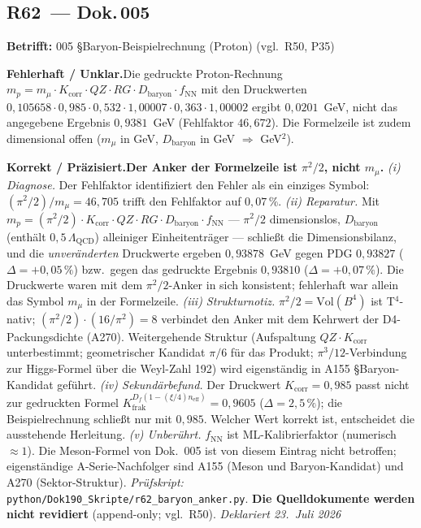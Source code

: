 \medskip


\subsection*{R62~--- Dok.\,005}

\noindent\textbf{Betrifft:} 005 \S{}Baryon-Beispielrechnung (Proton) (vgl.\ R50, P35)


\smallskip\noindent\textbf{Fehlerhaft / Unklar.}\quad Die gedruckte Proton-Rechnung
   $m_p = m_\mu \cdot K_\text{corr} \cdot QZ \cdot RG \cdot D_\text{baryon} \cdot f_\text{NN}$
   mit den Druckwerten $0{,}105658 \cdot 0{,}985 \cdot 0{,}532 \cdot 1{,}00007 \cdot 0{,}363 \cdot 1{,}00002$
   ergibt $0{,}0201$~GeV, nicht das angegebene Ergebnis $0{,}9381$~GeV
   (Fehlfaktor $46{,}672$). Die Formelzeile ist zudem dimensional offen
   ($m_\mu$ in GeV, $D_\text{baryon}$ in GeV $\Rightarrow$ GeV$^2$).


\smallskip\noindent\textbf{Korrekt / Präzisiert.}\quad \textbf{Der Anker der Formelzeile ist $\pi^2/2$, nicht $m_\mu$.}
   \emph{(i) Diagnose.} Der Fehlfaktor identifiziert den Fehler als ein
   einziges Symbol: $(\pi^2/2)/m_\mu = 46{,}705$ trifft den Fehlfaktor
   auf $0{,}07\,\%$. \emph{(ii) Reparatur.} Mit
   $m_p = (\pi^2/2)\cdot K_\text{corr}\cdot QZ\cdot RG\cdot
   D_\text{baryon}\cdot f_\text{NN}$ --- $\pi^2/2$ dimensionslos,
   $D_\text{baryon}$ (enthält $0{,}5\,\Lambda_\text{QCD}$) alleiniger
   Einheitenträger --- schließt die Dimensionsbilanz, und die
   \emph{unveränderten} Druckwerte ergeben $0{,}93878$~GeV gegen
   PDG $0{,}93827$ ($\Delta = +0{,}05\,\%$) bzw.\ gegen das gedruckte
   Ergebnis $0{,}93810$ ($\Delta = +0{,}07\,\%$). Die Druckwerte waren
   mit dem $\pi^2/2$-Anker in sich konsistent; fehlerhaft war allein
   das Symbol $m_\mu$ in der Formelzeile. \emph{(iii) Strukturnotiz.}
   $\pi^2/2 = \text{Vol}(B^4)$ ist T$^4$-nativ;
   $(\pi^2/2)\cdot(16/\pi^2) = 8$ verbindet den Anker mit dem Kehrwert
   der D4-Packungsdichte (A270). Weitergehende Struktur (Aufspaltung
   $QZ\cdot K_\text{corr}$ unterbestimmt; geometrischer Kandidat
   $\pi/6$ für das Produkt; $\pi^3/12$-Verbindung zur Higgs-Formel
   über die Weyl-Zahl 192) wird eigenständig in A155
   \S{}Baryon-Kandidat geführt.
   \emph{(iv) Sekundärbefund.} Der Druckwert $K_\text{corr} = 0{,}985$
   passt nicht zur gedruckten Formel
   $K_\text{frak}^{D_f(1-(\xi/4)n_\text{eff})} = 0{,}9605$
   ($\Delta = 2{,}5\,\%$); die Beispielrechnung schließt nur mit
   $0{,}985$. Welcher Wert korrekt ist, entscheidet die ausstehende
   Herleitung. \emph{(v) Unberührt.} $f_\text{NN}$ ist ML-Kalibrierfaktor
   (numerisch $\approx 1$). Die Meson-Formel von Dok.~005 ist von
   diesem Eintrag nicht betroffen; eigenständige A-Serie-Nachfolger
   sind A155 (Meson und Baryon-Kandidat) und A270 (Sektor-Struktur).
   \emph{Prüfskript:} \texttt{python/Dok190\_Skripte/r62\_baryon\_anker.py}.
   \textbf{Die Quelldokumente werden nicht revidiert}
   (append-only; vgl.\ R50). \emph{Deklariert 23.~Juli 2026}


